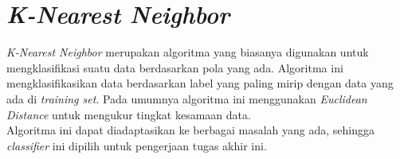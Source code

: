 \documentclass[../Proposal.tex]{subfiles}
\begin{document}
	\section{\textit{K-Nearest Neighbor}}
	\textit{K-Nearest Neighbor} merupakan algoritma yang biasanya digunakan untuk mengklasifikasi suatu data berdasarkan pola yang ada. Algoritma ini mengklasifikasikan data berdasarkan label yang paling mirip dengan data yang ada di \textit{training set}. Pada umumnya algoritma ini menggunakan \textit{Euclidean Distance} untuk mengukur tingkat kesamaan data\cite{knn}.\\ 
	Algoritma ini dapat diadaptasikan ke berbagai masalah yang ada, sehingga \textit{classifier} ini dipilih untuk pengerjaan tugas akhir ini.
\end{document}
